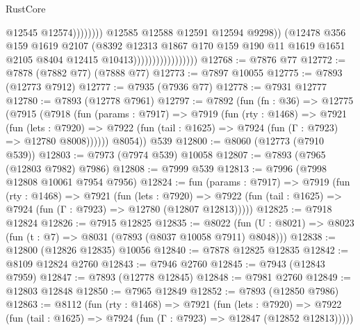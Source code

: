 \begin{lexlean}{RustCore}
\begin{coremodule}
                                                      @12545
                                                      @12574))))))))
                                      @12585
                                      @12588
                                      @12591
                                      @12594
                                      @9298))
                                  (@12478
                                    @356
                                    @159
                                    @1619
                                    @2107
                                    (@8392
                                      @12313
                                      @1867
                                      @170
                                      @159
                                      @190
                                      @11
                                      @1619
                                      @1651
                                      @2105
                                      @8404
                                      @12415
                                      @10413)))))))))))))))))
@12768 := @7876 @77
@12772 := @7878 (@7882 @77) (@7888 @77)
@12773 := @7897 @10055
@12775 := @7893 (@12773 @7912)
@12777 := @7935 (@7936 @77)
@12778 := @7931 @12777
@12780 := @7893 (@12778 @7961)
@12797 := @7892
    (fun (fn : @36) =>
    @12775
      (@7915
        (@7918
          (fun (params : @7917) =>
          @7919
            (fun (rty : @1468) =>
            @7921
              (fun (lets : @7920) =>
              @7922 (fun (tail : @1625) => @7924 (fun (Γ : @7923) => @12780 @8008))))))
        @8054))
    @539
@12800 := @8060 (@12773 (@7910 @539))
@12803 := @7973 (@7974 @539) @10058
@12807 := @7893 (@7965 (@12803 @7982) @7986)
@12808 := @7999 @539
@12813 := @7996 (@7998 @12808 @10061 @7954 @7956)
@12824 := fun (params : @7917) =>
  @7919
    (fun (rty : @1468) =>
    @7921
      (fun (lets : @7920) =>
      @7922 (fun (tail : @1625) => @7924 (fun (Γ : @7923) => @12780 (@12807 @12813)))))
@12825 := @7918 @12824
@12826 := @7915 @12825
@12835 := @8022
    (fun (U : @8021) => @8023 (fun (t : @7) => @8031 (@7893 (@8037 @10058 @7911) @8048)))
@12838 := @12800 (@12826 @12835) @10056
@12840 := @7878 @12825 @12835
@12842 := @8109 @12824 @2760
@12843 := @7946 @2760
@12845 := @7943 (@12843 @7959)
@12847 := @7893 (@12778 @12845)
@12848 := @7981 @2760
@12849 := @12803 @12848
@12850 := @7965 @12849
@12852 := @7893 (@12850 @7986)
@12863 := @8112
    (fun (rty : @1468) =>
    @7921
      (fun (lets : @7920) =>
      @7922 (fun (tail : @1625) => @7924 (fun (Γ : @7923) => @12847 (@12852 @12813)))))

\end{coremodule}
\end{lexlean}
